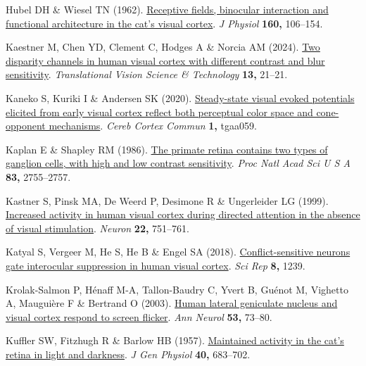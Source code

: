 \documentclass[
  letterpaper,
  DIV=11,
  numbers=noendperiod]{scrartcl}
\newlength{\cslhangindent}
\newenvironment{CSLReferences}[2] %
 {\begin{list}{}{%
  \setlength{\itemindent}{0pt}
  \setlength{\leftmargin}{0pt}
  \setlength{\parsep}{0pt}
  \ifodd #1
   \setlength{\leftmargin}{\cslhangindent}
   \setlength{\itemindent}{-1\cslhangindent}
  \fi
  \setlength{\itemsep}{#2\baselineskip}}}
 {\end{list}}
\begin{document}
\begin{CSLReferences}{1}{1}
Hubel DH \& Wiesel TN (1962).
\href{https://doi.org/10.1113/jphysiol.1962.sp006837}{Receptive fields,
binocular interaction and functional architecture in the cat's visual
cortex}. \emph{J Physiol} \textbf{160,} 106--154.

Kaestner M, Chen YD, Clement C, Hodges A \& Norcia AM (2024).
\href{https://doi.org/10.1167/tvst.13.2.21}{Two disparity channels in
human visual cortex with different contrast and blur sensitivity}.
\emph{Translational Vision Science \& Technology} \textbf{13,} 21--21.

Kaneko S, Kuriki I \& Andersen SK (2020).
\href{https://doi.org/10.1093/texcom/tgaa059}{Steady-state visual evoked
potentials elicited from early visual cortex reflect both perceptual
color space and cone-opponent mechanisms}. \emph{Cereb Cortex Commun}
\textbf{1,} tgaa059.

Kaplan E \& Shapley RM (1986).
\href{https://doi.org/10.1073/pnas.83.8.2755}{The primate retina
contains two types of ganglion cells, with high and low contrast
sensitivity}. \emph{Proc Natl Acad Sci U S A} \textbf{83,} 2755--2757.

Kastner S, Pinsk MA, De Weerd P, Desimone R \& Ungerleider LG (1999).
\href{https://doi.org/10.1016/s0896-6273(00)80734-5}{Increased activity
in human visual cortex during directed attention in the absence of
visual stimulation}. \emph{Neuron} \textbf{22,} 751--761.

Katyal S, Vergeer M, He S, He B \& Engel SA (2018).
\href{https://doi.org/10.1038/s41598-018-19809-w}{Conflict-sensitive
neurons gate interocular suppression in human visual cortex}. \emph{Sci
Rep} \textbf{8,} 1239.

Krolak-Salmon P, Hénaff M-A, Tallon-Baudry C, Yvert B, Guénot M,
Vighetto A, Mauguière F \& Bertrand O (2003).
\href{https://doi.org/10.1002/ana.10403}{Human lateral geniculate
nucleus and visual cortex respond to screen flicker}. \emph{Ann Neurol}
\textbf{53,} 73--80.

Kuffler SW, Fitzhugh R \& Barlow HB (1957).
\href{https://doi.org/10.1085/jgp.40.5.683}{Maintained activity in the
cat's retina in light and darkness}. \emph{J Gen Physiol} \textbf{40,}
683--702.


\end{CSLReferences}
\end{document}

